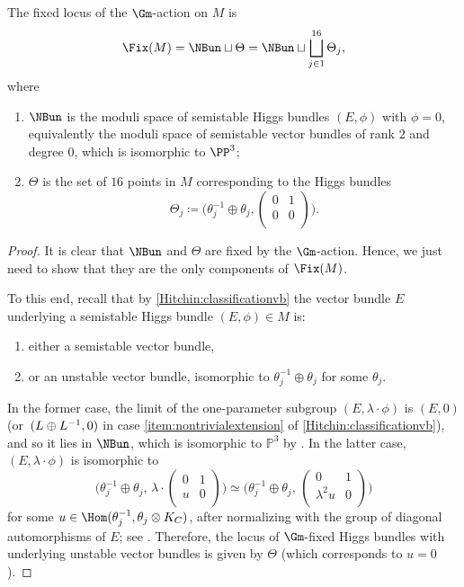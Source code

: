 \begin{prop}\label{prop:fixedlocusM}
The fixed locus of the $\Gm$\nobreakdash-action on $M$ is\vspace*{-3pt}
\[
\Fix(M)= \NBun \sqcup \Theta = \NBun \sqcup \bigsqcup^{16}_{j \in 1} \Theta_j,
\]
where
\begin{enumerate}
\item $\NBun$ is the moduli space of semistable Higgs bundles $(E, \phi)$ with $\phi=0$, equivalently the moduli space of semistable vector bundles of rank $2$ and
degree $0$, which is isomorphic to $\PP^3$;
\item $\Theta$ is the set of $16$ points in $M$ corresponding to the Higgs bundles\vspace*{-3pt}
\[
\Theta_j \coloneqq \bigg(\theta^{-1}_j \oplus \theta_j, \begin{pmatrix}
0 & 1\\
0 & 0\\
\end{pmatrix}\bigg).
\]
\end{enumerate}
\end{prop}
\begin{proof}

It is clear that $\NBun$ and $\Theta$ are fixed by the $\Gm$\nobreakdash-action. Hence, we just need to show that they are the only components of $\Fix(M)$.

To this end, recall that by \cref{Hitchin:classificationvb} the vector bundle $E$ underlying a semistable Higgs bundle $(E, \phi) \in M$ is:
\begin{enumerate}
\item either a semistable vector bundle,
\item or an unstable vector bundle, isomorphic to $\theta^{-1}_j \oplus \theta_j$ for some $\theta_j$.
\end{enumerate}
In the former case, the limit of the one-parameter subgroup $(E, \lambda \cdot \phi)$ is $(E, 0)$ (or~$(L \oplus\nobreak L^{-1}, 0)$ in case \eqref{item:nontrivialextension} of \cref{Hitchin:classificationvb}), and so it lies in $\NBun$, which is isomorphic to $\mathbb{P}^3$ by \cite{NarasimhanRamanan69}.
In the latter case, $(E, \lambda \cdot \phi)$ is isomorphic to
\begin{equation}\label{isotropicsliceTheta}
\bigg(\theta^{-1}_j \oplus \theta_j, \,\lambda \cdot \begin{pmatrix}
0 & 1\\
u & 0\\
\end{pmatrix}\bigg) \simeq \bigg(\theta^{-1}_j \oplus \theta_j, \,\begin{pmatrix}
0 & 1\\
\lambda^2 u & 0\\
\end{pmatrix}\bigg)
\end{equation}
for some $u\in \Hom(\theta_j^{-1},\theta_j \otimes K_C)$, after normalizing with the group of diagonal automorphisms of $E$; see \cite[\S 11]{Hitchin1987}. Therefore, the locus of $\Gm$\nobreakdash-fixed Higgs bundles with underlying unstable vector bundles is given by $\Theta$ (which corresponds to $u=0$).
\end{proof}

